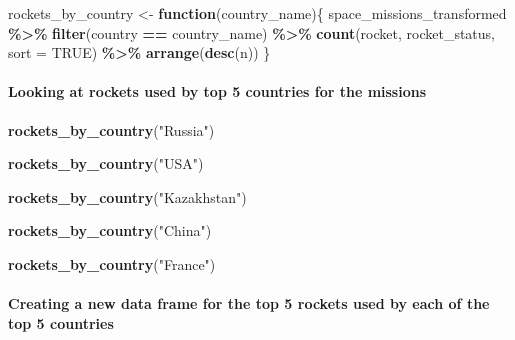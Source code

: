 \documentclass[
]{article}
\newenvironment{Shaded}{\begin{snugshade}}{\end{snugshade}}
\newcommand{\AttributeTok}[1]{\textcolor[rgb]{0.13,0.29,0.53}{#1}}
\newcommand{\ConstantTok}[1]{\textcolor[rgb]{0.56,0.35,0.01}{#1}}
\newcommand{\ControlFlowTok}[1]{\textcolor[rgb]{0.13,0.29,0.53}{\textbf{#1}}}
\newcommand{\FunctionTok}[1]{\textcolor[rgb]{0.13,0.29,0.53}{\textbf{#1}}}
\newcommand{\NormalTok}[1]{#1}
\newcommand{\OtherTok}[1]{\textcolor[rgb]{0.56,0.35,0.01}{#1}}
\newcommand{\SpecialCharTok}[1]{\textcolor[rgb]{0.81,0.36,0.00}{\textbf{#1}}}
\newcommand{\StringTok}[1]{\textcolor[rgb]{0.31,0.60,0.02}{#1}}
\begin{document}
\begin{Shaded}
\begin{Highlighting}[]
\NormalTok{rockets\_by\_country }\OtherTok{\textless{}{-}} \ControlFlowTok{function}\NormalTok{(country\_name)\{}
\NormalTok{  space\_missions\_transformed }\SpecialCharTok{\%\textgreater{}\%}
    \FunctionTok{filter}\NormalTok{(country }\SpecialCharTok{==}\NormalTok{ country\_name) }\SpecialCharTok{\%\textgreater{}\%} 
    \FunctionTok{count}\NormalTok{(rocket, rocket\_status, }\AttributeTok{sort =} \ConstantTok{TRUE}\NormalTok{) }\SpecialCharTok{\%\textgreater{}\%}
    \FunctionTok{arrange}\NormalTok{(}\FunctionTok{desc}\NormalTok{(n))}
\NormalTok{\}}
\end{Highlighting}
\end{Shaded}

\hypertarget{looking-at-rockets-used-by-top-5-countries-for-the-missions}{%
\paragraph{Looking at rockets used by top 5 countries for the
missions}\label{looking-at-rockets-used-by-top-5-countries-for-the-missions}}

\begin{Shaded}
\begin{Highlighting}[]
\FunctionTok{rockets\_by\_country}\NormalTok{(}\StringTok{"Russia"}\NormalTok{)}

\FunctionTok{rockets\_by\_country}\NormalTok{(}\StringTok{"USA"}\NormalTok{)}

\FunctionTok{rockets\_by\_country}\NormalTok{(}\StringTok{"Kazakhstan"}\NormalTok{)}

\FunctionTok{rockets\_by\_country}\NormalTok{(}\StringTok{"China"}\NormalTok{)}

\FunctionTok{rockets\_by\_country}\NormalTok{(}\StringTok{"France"}\NormalTok{)}
\end{Highlighting}
\end{Shaded}

\hypertarget{creating-a-new-data-frame-for-the-top-5-rockets-used-by-each-of-the-top-5-countries}{%
\paragraph{Creating a new data frame for the top 5 rockets used by each
of the top 5
countries}\label{creating-a-new-data-frame-for-the-top-5-rockets-used-by-each-of-the-top-5-countries}}
\end{document}
